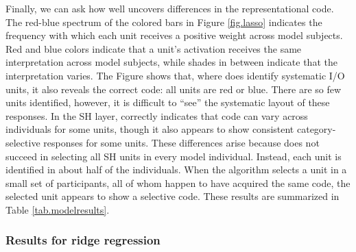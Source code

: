 Finally, we can ask how well {\lasso} uncovers differences in the representational code. The red-blue spectrum of the colored bars in Figure \ref{fig.lasso} indicates the frequency with which each unit receives a positive weight across model subjects. Red and blue colors indicate that a unit's activation receives the same interpretation across model subjects, while shades in between indicate that the interpretation varies. The Figure shows that, where {\lasso} does identify systematic I/O units, it also reveals the correct code: all units are red or blue. There are so few units identified, however, it is difficult to ``see'' the systematic layout of these responses. In the SH layer, {\lasso} correctly indicates that code can vary across individuals for some units, though it also appears to show consistent category-selective responses for some units. These differences arise because {\lasso} does not succeed in selecting all SH units in every model individual. Instead, each unit is identified in about half of the individuals. When the algorithm selects a unit in a small set of participants, all of whom happen to have acquired the same code, the selected unit appears to show a selective code. These results are summarized in Table \ref{tab.modelresults}.


\subsubsection{Results for ridge regression}

